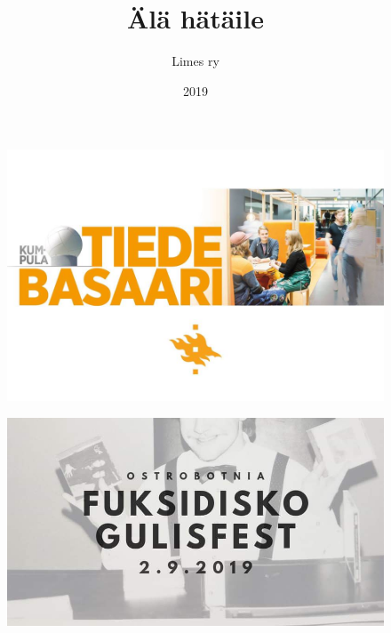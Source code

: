 \documentclass[a5paper, 8pt, twocolumn]{book} %
\title{Älä hätäile}
\date{2019}
\author{Limes ry}
\numberwithin{equation}{section}
\begin{document}
\raggedbottom
\frontmatter
\null


\thispagestyle{empty}
\begin{figure}[h!]
	\href{https://www.facebook.com/events/495938574557920/}{\includegraphics*[width=\textwidth]{tiedebasaari.jpg}}
\end{figure}
\begin{figure}[h!]
	\href{https://www.facebook.com/events/613237405833437/}{\includegraphics*[width=\textwidth]{fuksidisko.jpg}}
\end{figure}
\end{document}
